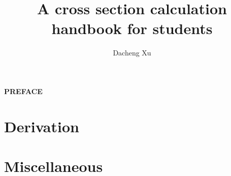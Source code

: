 \documentclass[titlepage]{book}
\title{\textbf{\huge{A cross section calculation handbook for students}}}
\author{
    Dacheng Xu
}
\date{}
\begin{document}

\maketitle


\begin{center}
    \textbf{\Large{PREFACE}}
\end{center}




\pagestyle{empty}
\renewcommand{\baselinestretch}{0.94}\normalsize
\tableofcontents
\renewcommand{\baselinestretch}{1.0}\normalsize
\restoregeometry
\pagestyle{fancy}

\clearpage



\section{Derivation}





\section{Miscellaneous}


% 
\end{document}
